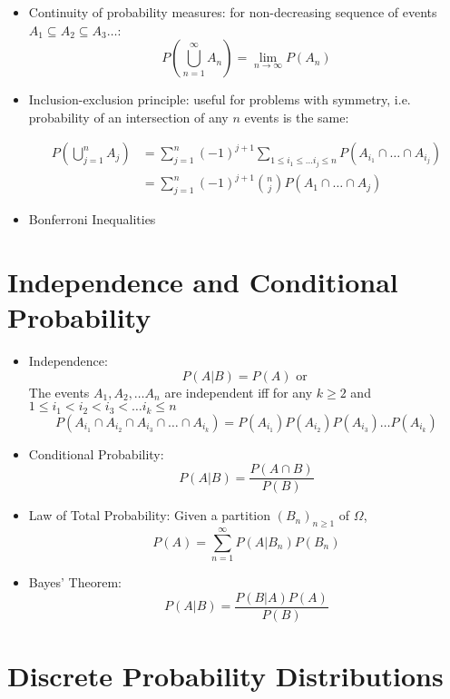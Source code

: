\begin{itemize}
      \item Continuity of probability measures: for non-decreasing sequence of events $A_1 \subseteq A_2 \subseteq A_3 \dots $:
            \[ P \left( \bigcup_{n=1}^{\infty}A_n \right) = \lim_{n \to \infty} P(A_n)\]

      \item Inclusion-exclusion principle: useful for problems with symmetry, i.e. probability of an intersection of any $n$ events is the same:

            \begin{align*}
                  P \left(\bigcup_{j=1}^{n} A_j \right)
                   & = \sum_{j=1}^{n} (-1)^{j+1} \sum_{1 \leq i_1 \leq \dots i_j \leq n} P(A_{i_1} \cap \dots \cap A_{i_j}) \\
                   & = \sum_{j=1}^{n} (-1)^{j+1} \binom{n}{j} P(A_1 \cap \dots \cap A_j)
            \end{align*}

      \item Bonferroni Inequalities

\end{itemize}


\section{Independence and Conditional Probability}
\begin{itemize}
      \item Independence:
            \[P(A|B) = P(A) \text{ or } \]
            The events $A_1, A_2, \dots A_n$ are independent iff for any $k\geq 2$ and $ 1 \leq i_1 < i_2 < i_3 < \dots i_k \leq n $
            \[ P(A_{i_1} \cap A_{i_2} \cap A_{i_3} \cap \dots \cap A_{i_k}) =  P(A_{i_1}) P(A_{i_2}) P(A_{i_3}) \dots P(A_{i_k}) \]

      \item Conditional Probability:
            \[P(A|B) = \frac{P(A\cap B)}{P(B)}\]
      \item Law of Total Probability: Given a partition $(B_n)_{n\geq 1}$ of $\Omega$, \[P(A) = \sum_{n=1}^{\infty} P(A|B_n) P(B_n)\]
      \item Bayes' Theorem:
            \[P(A|B) = \frac{P(B|A)P(A)}{P(B)}\]
\end{itemize}

\section{Discrete Probability Distributions}

